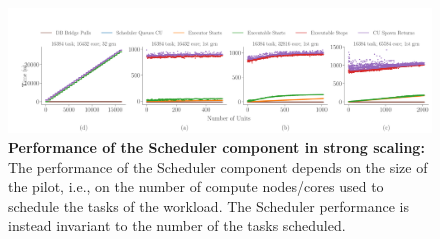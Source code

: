 \documentclass{article}
\begin{document}
\begin{figure}
  \centering
  \includegraphics[width=\textwidth]{figures/screen_titan_rp_synapse_strong_scaling_events_timeline_1stgen_horizontal.png}
  \caption{\textbf{Performance of the Scheduler component in strong scaling:}
	The performance of the Scheduler component depends on the size of the
	pilot, i.e., on the number of compute nodes/cores used to schedule the
	tasks of the workload. The Scheduler performance is instead invariant to
	the number of the tasks scheduled. }\label{fig:ss-events-1stgen}
\end{figure}
\end{document}
